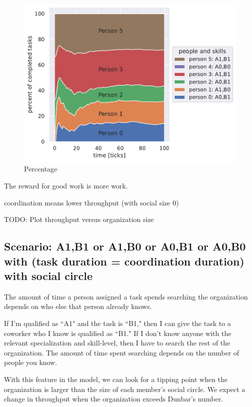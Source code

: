 \begin{figure}
\centering
\includegraphics{images/task_distribution_percent_of_tasks_per_person_simCount1_skills2_levels1_taskduration1_people6_social0_ticks100.pdf}
\caption{Percentage}
\label{fig:task-distribution-percent-of-tasks}
\end{figure}

 
The reward for good work is more work.

coordination means lower throughput (with social size 0)

TODO: Plot throughput versus organization size 


\subsection*{Scenario: A1,B1 or A1,B0 or A0,B1 or A0,B0\\with (task duration = coordination duration)\\with social circle}

The amount of time a person assigned a task spends searching the organization depends on who else that person already knows. 

If I'm qualified as ``A1" and the task is ``B1," then I can give the task to a coworker who I know is qualified as ``B1." If I don't know anyone with the relevant specialization and skill-level, then I have to search the rest of the organization.
The amount of time spent searching depends on the number of people you know. 

With this feature in the model, we can look for a tipping point when the organization is larger than the size of each member's social circle. We expect a change in throughput when the organization exceeds Dunbar's number.

